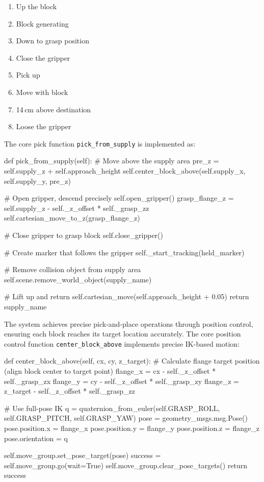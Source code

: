 \documentclass[12pt, a4paper]{article}
\begin{document}
\begin{enumerate}
    \item Up the block
    \item Block generating
    \item Down to grasp position
    \item Close the gripper
    \item Pick up
    \item Move with block
    \item 14\,cm above destination
    \item Loose the gripper
\end{enumerate}

The core pick function \texttt{pick\_from\_supply} is implemented as:

\begin{pythoncode}
def pick_from_supply(self):
    # Move above the supply area
    pre_z = self.supply_z + self.approach_height
    self.center_block_above(self.supply_x, self.supply_y, pre_z)
    
    # Open gripper, descend precisely
    self.open_gripper()
    grasp_flange_z = self.supply_z - self._z_offset * self._grasp_zz
    self.cartesian_move_to_z(grasp_flange_z)
    
    # Close gripper to grasp block
    self.close_gripper()
    
    # Create marker that follows the gripper
    self._start_tracking(held_marker)
    
    # Remove collision object from supply area
    self.scene.remove_world_object(supply_name)
    
    # Lift up and return
    self.cartesian_move(self.approach_height + 0.05)
    return supply_name
\end{pythoncode}

The system achieves precise pick-and-place operations through position control, ensuring each block reaches its target location accurately. The core position control function \texttt{center\_block\_above} implements precise IK-based motion:

\begin{pythoncode}
def center_block_above(self, cx, cy, z_target):
    # Calculate flange target position (align block center to target point)
    flange_x = cx - self._z_offset * self._grasp_zx
    flange_y = cy - self._z_offset * self._grasp_zy
    flange_z = z_target - self._z_offset * self._grasp_zz
    
    # Use full-pose IK
    q = quaternion_from_euler(self.GRASP_ROLL, self.GRASP_PITCH, self.GRASP_YAW)
    pose = geometry_msgs.msg.Pose()
    pose.position.x = flange_x
    pose.position.y = flange_y
    pose.position.z = flange_z
    pose.orientation = q
    
    self.move_group.set_pose_target(pose)
    success = self.move_group.go(wait=True)
    self.move_group.clear_pose_targets()
    return success
\end{pythoncode}
\end{document}

